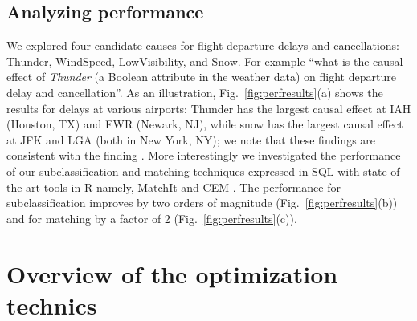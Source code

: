 {\subsection{Analyzing performance}

 We
explored four candidate causes for flight departure delays and
cancellations: Thunder, WindSpeed, LowVisibility, and Snow.  For
example ``what is the causal effect of {\em Thunder} (a Boolean
attribute in the weather data) on flight departure delay and
cancellation''.  As an illustration, Fig.~\ref{fig:perfresults}(a)
shows the results for delays at various airports: Thunder has the
largest causal effect at IAH (Houston, TX) and EWR
(Newark, NJ), while snow has the largest causal effect at JFK and LGA
(both in New York, NY); we note that these findings are consistent
with the finding \cite{weather}. More interestingly we investigated the performance of our
subclassification and matching techniques expressed in SQL with state
of the art tools in R namely, MatchIt \cite{ho1737matchit}
and CEM \cite{iacus2009cem}. The performance for subclassification improves
by two orders of magnitude (Fig.~\ref{fig:perfresults}(b)) and for matching by a
factor of 2 (Fig.~\ref{fig:perfresults}(c)).
}

\section{Overview of the optimization technics}

